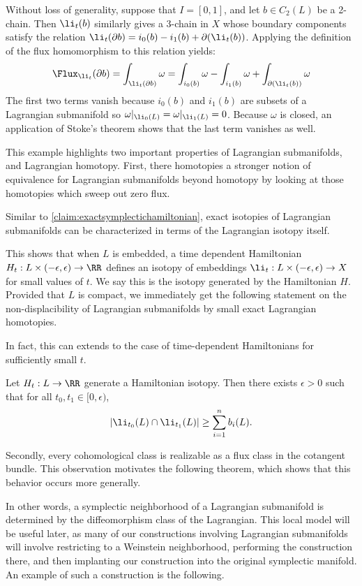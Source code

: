 Without loss of generality, suppose that $I=[0,1]$, and let $b\in C_2(L)$ be a 2-chain.
Then $\li_t(b)$ similarly gives a 3-chain in $X$ whose boundary components satisfy the relation $\li_t(\partial b)=i_0(b)-i_1(b)+\partial(\li_t(b))$. 
Applying the definition of the flux homomorphism to this relation yields:
\[
    \Flux_{\li_t}(\partial b)=\int_{\li_t(\partial b)}\omega=\int_{i_0(b)}\omega-\int_{i_1(b)}\omega + \int_{\partial(\li_t(b))}\omega\]
The first two terms vanish because $i_0(b)$ and $i_1(b)$ are subsets of a Lagrangian submanifold so $\omega|_{\li_0(L)}=\omega|_{\li_1(L)}=0$.
Because $\omega$ is closed, an application of Stoke's theorem shows that the last term vanishes as well. 



This example highlights two important properties of Lagrangian submanifolds, and Lagrangian homotopy. 
First, there homotopies a stronger notion of equivalence for Lagrangian submanifolds beyond homotopy by looking at those homotopies which sweep out zero flux. 

Similar to \cref{claim:exactsymplectichamiltonian}, exact isotopies of Lagrangian submanifolds can be characterized in terms of the Lagrangian isotopy itself. 


This shows that when $L$ is embedded, a time dependent Hamiltonian $H_t: L\times (-\epsilon, \epsilon)\to \RR$ defines an isotopy of embeddings $\li_t: L\times(-\epsilon, \epsilon)\to X$ for small values of $t$.
We say this is the isotopy generated by the Hamiltonian $H$.
Provided that $L$ is compact, we immediately get the following statement on the non-displacibility of Lagrangian submanifolds by small exact Lagrangian homotopies. 


In fact, this can extends to the case of time-dependent Hamiltonians for sufficiently small $t$. 
\begin{corollary}
    Let $H_t: L\to \RR$ generate a Hamiltonian isotopy. 
    Then there exists $\epsilon>0$ such that for all $t_0, t_1\in [0,\epsilon)$, 
    \[|\li_{t_0}(L)\cap \li_{t_1}(L)|\geq \sum_{i=1}^n b_i(L).\]
\end{corollary}
Secondly, every cohomological class is realizable as a flux class in the cotangent bundle. 
This observation motivates the following theorem, which shows that this behavior occurs more generally.

In other words,  a symplectic neighborhood of a Lagrangian submanifold is determined by the diffeomorphism class of the Lagrangian. 
This local model will be useful later, as many of our constructions involving Lagrangian submanifolds will involve restricting to a Weinstein neighborhood, performing the construction there, and then implanting our construction into the original symplectic manifold.
An example of such a construction is the following.


